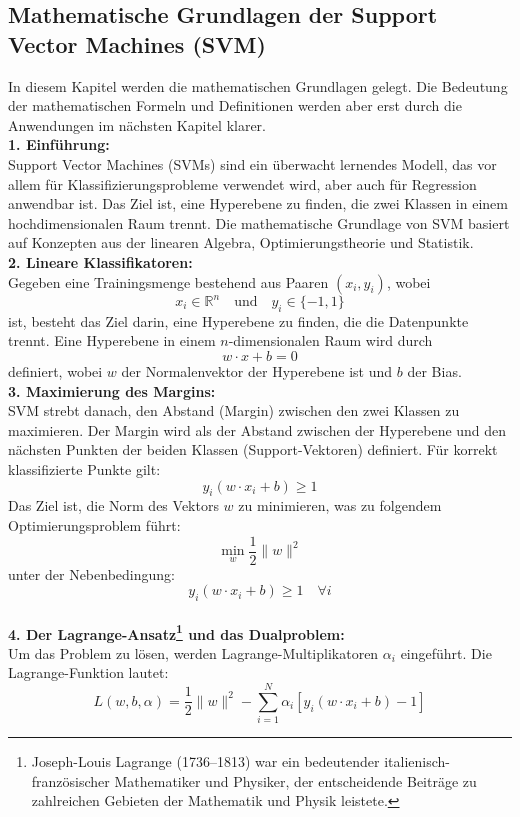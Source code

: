 \documentclass[12pt]{article}
\begin{document}
\subsection{Mathematische Grundlagen der Support Vector Machines (SVM)}
%
In diesem Kapitel werden die mathematischen Grundlagen gelegt. Die Bedeutung der mathematischen Formeln und Definitionen werden aber erst durch die Anwendungen im nächsten Kapitel klarer. \\[0.2cm]
\textbf{1. Einführung:}\\
Support Vector Machines (SVMs) sind ein überwacht lernendes Modell, das vor allem für Klassifizierungsprobleme verwendet wird, aber auch für Regression anwendbar ist. Das Ziel ist, eine Hyperebene zu finden, die zwei Klassen in einem hochdimensionalen Raum trennt. Die mathematische Grundlage von SVM basiert auf Konzepten aus der linearen Algebra, Optimierungstheorie und Statistik.\\[0.2cm]
%
\textbf{2. Lineare Klassifikatoren:}\\
Gegeben eine Trainingsmenge bestehend aus Paaren \((x_i, y_i)\), wobei
\[
x_i \in \mathbb{R}^n \quad \text{und} \quad y_i \in \{-1, 1\}
\]
ist, besteht das Ziel darin, eine Hyperebene zu finden, die die Datenpunkte trennt. Eine Hyperebene in einem \(n\)-dimensionalen Raum wird durch
\[
w \cdot x + b = 0
\]
definiert, wobei \(w\) der Normalenvektor der Hyperebene ist und \(b\) der Bias. \\[0.2cm]
%
\textbf{3. Maximierung des Margins:}\\
SVM strebt danach, den Abstand (Margin) zwischen den zwei Klassen zu maximieren. Der Margin wird als der Abstand zwischen der Hyperebene und den nächsten Punkten der beiden Klassen (Support-Vektoren) definiert. Für korrekt klassifizierte Punkte gilt:
\[
y_i (w \cdot x_i + b) \geq 1
\]
%
Das Ziel ist, die Norm des Vektors \(w\) zu minimieren, was zu folgendem Optimierungsproblem führt:
\[
\min_w \frac{1}{2} \|w\|^2
\]
unter der Nebenbedingung:
\[
y_i (w \cdot x_i + b) \geq 1 \quad \forall i
\]\\
\textbf{4. Der Lagrange-Ansatz\footnote{Joseph-Louis Lagrange (1736–1813) war ein bedeutender italienisch-französischer Mathematiker und Physiker, der entscheidende Beiträge zu zahlreichen Gebieten der Mathematik und Physik leistete.} und das Dualproblem:} \\
Um das Problem zu lösen, werden Lagrange-Multiplikatoren \(\alpha_i\) eingeführt. Die Lagrange-Funktion lautet:
\[
L(w, b, \alpha) = \frac{1}{2} \|w\|^2 - \sum_{i=1}^N \alpha_i [y_i (w \cdot x_i + b) - 1]
\]
\end{document}
